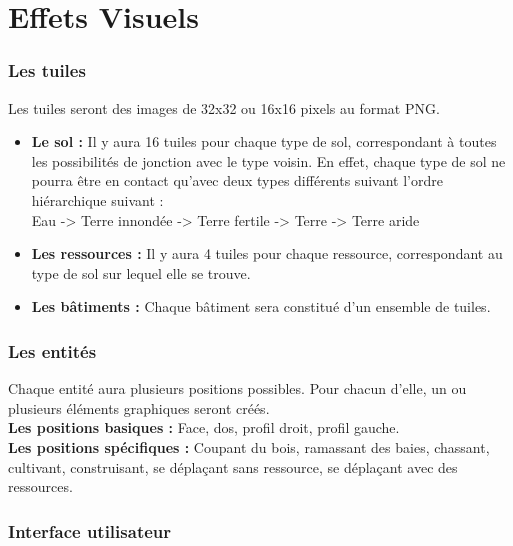 \documentclass[a4paper]{article}
\begin{document}

  \newpage
  \part{Effets Visuels}


    \section{Les tuiles}
      Les tuiles seront des images de 32x32 ou 16x16 pixels au format PNG.\\
      \begin{itemize}
        \item \textbf{Le sol :}\small{ Il y aura 16 tuiles pour chaque type de sol, correspondant à toutes les possibilités de jonction avec le type voisin. En effet, chaque type de sol ne pourra être en contact qu'avec deux types différents suivant l'ordre hiérarchique suivant :\\
          Eau -> Terre innondée -> Terre fertile -> Terre -> Terre aride}
        \item \textbf{Les ressources :}\small{ Il y aura 4 tuiles pour chaque ressource, correspondant au type de sol sur lequel elle se trouve.}
        \item \textbf{Les bâtiments :}\small{ Chaque bâtiment sera constitué d'un ensemble de tuiles.}
      \end{itemize}
  
    \section{Les entités}
      Chaque entité aura plusieurs positions possibles. Pour chacun d'elle, un ou plusieurs éléments graphiques seront créés.\\
      \textbf{Les positions basiques :}\small{ Face, dos, profil droit, profil gauche.}\\
      \textbf{Les positions spécifiques :}\small{ Coupant du bois, ramassant des baies, chassant, cultivant, construisant, se déplaçant sans ressource, se déplaçant avec des ressources.}
	
	\section{Interface utilisateur}
		
\end{document}
